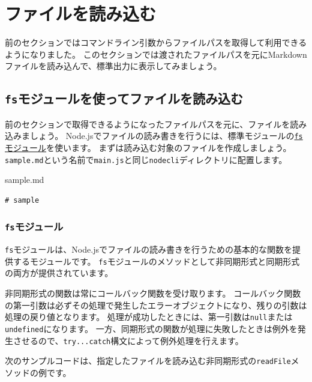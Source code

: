 \hypertarget{read-file}{%
\section{ファイルを読み込む}\label{read-file}}

前のセクションではコマンドライン引数からファイルパスを取得して利用できるようになりました。
このセクションでは渡されたファイルパスを元にMarkdownファイルを読み込んで、標準出力に表示してみましょう。

\hypertarget{read-file-by-fs}{%
\subsection{\texorpdfstring{\texttt{fs}モジュールを使ってファイルを読み込む}{fsモジュールを使ってファイルを読み込む}}\label{read-file-by-fs}}

前のセクションで取得できるようになったファイルパスを元に、ファイルを読み込みましょう。
Node.jsでファイルの読み書きを行うには、標準モジュールの\href{https://nodejs.org/api/fs.html}{\texttt{fs}モジュール}を使います。
まずは読み込む対象のファイルを作成しましょう。\texttt{sample.md}という名前で\texttt{main.js}と同じ\texttt{nodecli}ディレクトリに配置します。

\begin{listtitle}
sample.md
\end{listtitle}
\begin{lstlisting}
# sample
\end{lstlisting}
\listend

\hypertarget{fs-module}{%
\subsubsection{\texorpdfstring{\texttt{fs}モジュール}{fsモジュール}}\label{fs-module}}

\texttt{fs}モジュールは、Node.jsでファイルの読み書きを行うための基本的な関数を提供するモジュールです。
\texttt{fs}モジュールのメソッドとして非同期形式と同期形式の両方が提供されています。

非同期形式の関数は常にコールバック関数を受け取ります。
コールバック関数の第一引数は必ずその処理で発生したエラーオブジェクトになり、残りの引数は処理の戻り値となります。
処理が成功したときには、第一引数は\texttt{null}または\texttt{undefined}になります。
一方、同期形式の関数が処理に失敗したときは例外を発生させるので、\texttt{try...catch}構文によって例外処理を行えます。

次のサンプルコードは、指定したファイルを読み込む非同期形式の\texttt{readFile}メソッドの例です。

